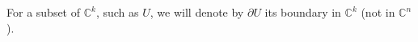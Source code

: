 \documentclass[12pt]{amsbook}%
\theoremstyle{definition}
\theoremstyle{remark}
\numberwithin{section}{chapter}
\numberwithin{subsection}{section}
\numberwithin{figure}{chapter}
\newcommand\bac[1]{{\color{blue} #1} }
\def\bC{{\mathbb{C}}}
\def\fd{{\mathfrak{d}}}
\def\kap{}
\begin{document}
{{%


For a subset of $\bC^k$, such as $U$, we will denote by $\partial U$ its boundary in $\bC^k$ (not in $\bC^n$).
%



}}
\end{document}
